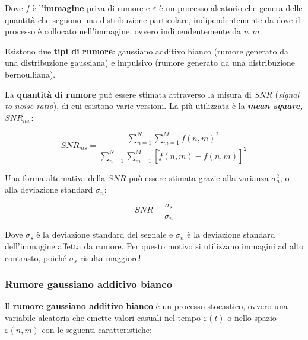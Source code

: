 \documentclass[a4paper]{article}
\begin{document}
	\noindent
	Dove $f$ è l'\textbf{immagine} priva di rumore e $\varepsilon$ è un processo aleatorio che genera delle quantità che seguono una distribuzione particolare, indipendentemente da dove il processo è collocato nell'immagine, ovvero indipendentemente da $n,m$.\newline
	
	\noindent
	Esistono due \textbf{tipi di rumore}: gaussiano additivo bianco (rumore generato da una distribuzione gaussiana) e impulsivo (rumore generato da una distribuzione bernoulliana).\newline
	
	\noindent
	La \textbf{quantità di rumore} può essere stimata attraverso la misura di $SNR$\label{SNR} (\emph{signal to noise ratio}), di cui esistono varie versioni. La più utilizzata è la \emph{\textbf{mean square, $SNR_{ms}$}}:
	
	\begin{equation*}
		SNR_{ms} = \dfrac{
		\displaystyle\sum_{n=1}^{N}\sum_{m=1}^{M} \tilde{f}\left(n,m\right)^{2}
		}{
		\displaystyle\sum_{n=1}^{N}\sum_{m=1}^{M} \left[\tilde{f}\left(n,m\right) - f\left(n,m\right)\right]^{2}
		}
	\end{equation*}

	\noindent
	Una forma alternativa della $SNR$ può essere stimata grazie alla varianza $\sigma_{n}^{2}$, o alla deviazione standard $\sigma_{n}$:
	
	\begin{equation*}
		SNR = \dfrac{\sigma_{s}}{\sigma_{n}}
	\end{equation*}

	\noindent
	Dove $\sigma_{s}$ è la deviazione standard del segnale e $\sigma_{n}$ è la deviazione standard dell'immagine affetta da rumore. Per questo motivo si utilizzano immagini ad alto contrasto, poiché $\sigma_{s}$ risulta maggiore!
	
	\newpage
	
	\subsubsection{Rumore gaussiano additivo bianco}
	
	Il \textcolor{Red3}{\textbf{\underline{rumore gaussiano additivo bianco}}} è un processo stocastico, ovvero una variabile aleatoria che emette valori casuali nel tempo $\varepsilon\left(t\right)$ o nello spazio $\varepsilon\left(n,m\right)$ con le seguenti caratteristiche:
	
\end{document}
